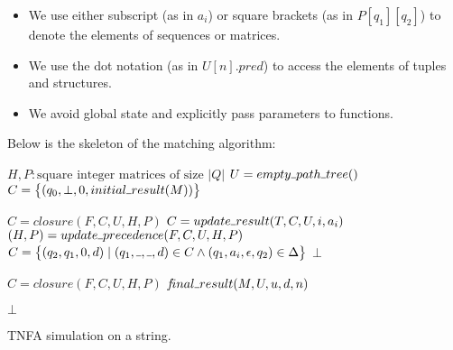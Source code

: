 \documentclass[AMA,STIX1COL]{WileyNJD-v2}
\newcommand{\Xund}{\rule{.4em}{.4pt}}
\begin{document}
\begin{itemize}[itemsep=0.2em, topsep=0.5em]
    \item We use either subscript (as in $a_i$) or square brackets (as in $P[q_1][q_2]$) to denote the elements of sequences or matrices.

    \item We use the dot notation (as in $U[n].pred$) to access the elements of tuples and structures.

    \item We avoid global state and explicitly pass parameters to functions.
    \\[-0.5em]
\end{itemize}

Below is the skeleton of the matching algorithm:

\begin{algorithm}[H] \DontPrintSemicolon {} 
 {

    $H, P : \text{square integer matrices of size } |Q|$ \;
    $U = empty \Xund path \Xund tree()$ \;
    $C = \big\{ (q_0, \bot, 0, initial \Xund result(M)) \big\}$ \;

    \BlankLine
     {
        $C = closure(F, C, U, H, P)$ \;
        $C = update \Xund result(T, C, U, i, a_i)$ \;
        $(H, P) = update \Xund precedence(F, C, U, H, P)$ \;
        $C = \big\{ (q_2, q_1, 0, d) \mid (q_1, \Xund, \Xund, d) \in C \wedge (q_1, a_i, \epsilon, q_2) \in \Delta \big\}$ \;
         {
            \Return $\bot$
        }
    }

    \BlankLine
    $C = closure(F, C, U, H, P)$ \;
    \If {$\exists (q, \Xund, u, d) \in C \mid q = q_f$} {
        \Return $f\!inal \Xund result (M, U, u, d, n)$
    }

    \BlankLine
    \Return $\bot$

    \BlankLine
}
\caption{TNFA simulation on a string.}\label{alg_match}
\end{algorithm}
\medskip
\end{document}
